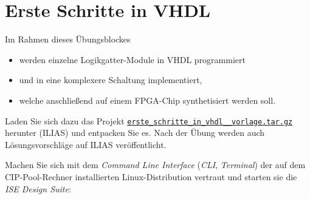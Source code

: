 \documentclass[12pt]{article}
\begin{document}




\part*{Erste Schritte in VHDL}


Im Rahmen dieses Übungsblockes
\vspace*{-5pt}
\begin{itemize}
    \setlength\itemsep{-5pt}
    \item werden einzelne Logikgatter-Module in VHDL programmiert
    \item und in eine komplexere Schaltung implementiert,
    \item welche anschließend auf einem FPGA-Chip synthetisiert werden soll.
\end{itemize}


Laden Sie sich dazu das Projekt \textcolor{blue}{\href{https://ilias.uni-freiburg.de/goto.php?target=file_2288412_download&client_id=unifreiburg}{\texttt{erste\_schritte\_in\_vhdl\_\_vorlage.tar.gz}}} herunter (ILIAS) und entpacken Sie es.
Nach der Übung werden auch Lösungsvorschläge auf ILIAS veröffentlicht.







Machen Sie sich mit dem \textit{Command Line Interface} (\textit{CLI}, \textit{Terminal}) der auf dem CIP-Pool-Rechner installierten Linux-Distribution vertraut
und starten sie die \textit{ISE Design Suite}:
\end{document}

